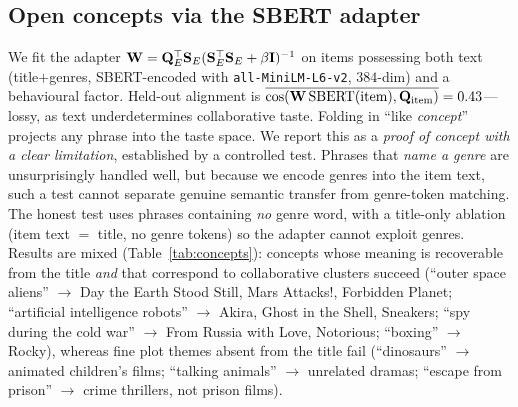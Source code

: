 \subsection{Open concepts via the SBERT adapter}\label{sec:concepts}
We fit the adapter $\mathbf{W}=\mathbf{Q}_E^\top\mathbf S_E(\mathbf S_E^\top\mathbf S_E+\beta\mathbf{I})^{-1}$ on items possessing both
text (title$+$genres, SBERT-encoded with \texttt{all-MiniLM-L6-v2}, $384$-dim) and a behavioural factor. Held-out
alignment is $\overline{\cos(\mathbf{W}\,\mathrm{SBERT}(\text{item}),\mathbf{Q}_{\text{item}})}=0.43$---lossy, as text
underdetermines collaborative taste. Folding in ``like \emph{concept}'' projects any phrase into the taste space.
We report this as a \emph{proof of concept with a clear limitation}, established by a controlled test. Phrases that
\emph{name a genre} are unsurprisingly handled well, but because we encode genres into the item text, such a test
cannot separate genuine semantic transfer from genre-token matching. The honest test uses phrases containing
\emph{no} genre word, with a title-only ablation (item text $=$ title, no genre tokens) so the adapter cannot
exploit genres. Results are mixed (Table~\ref{tab:concepts}): concepts whose meaning is recoverable from the title
\emph{and} that correspond to collaborative clusters succeed (``outer space aliens'' $\to$ Day the Earth Stood
Still, Mars Attacks!, Forbidden Planet; ``artificial intelligence robots'' $\to$ Akira, Ghost in the Shell,
Sneakers; ``spy during the cold war'' $\to$ From Russia with Love, Notorious; ``boxing'' $\to$ Rocky), whereas fine
plot themes absent from the title fail (``dinosaurs'' $\to$ animated children's films; ``talking animals'' $\to$
unrelated dramas; ``escape from prison'' $\to$ crime thrillers, not prison films).

